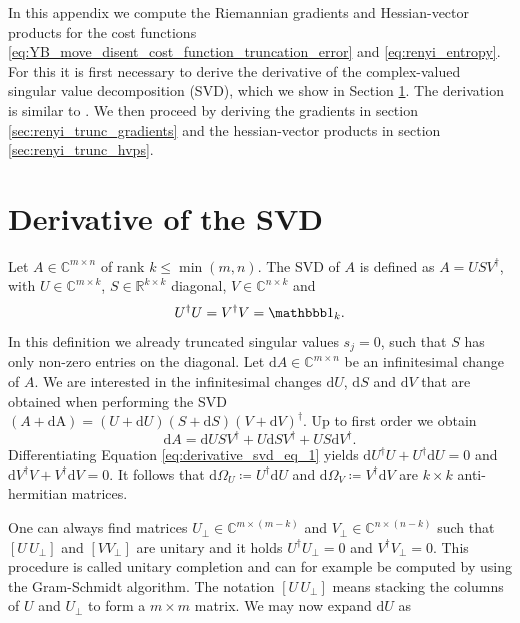 In this appendix we compute the Riemannian gradients and Hessian-vector products for the cost functions \eqref{eq:YB_move_disent_cost_function_truncation_error} and \eqref{eq:renyi_entropy}. For this it is first necessary to derive the derivative of the complex-valued singular value decomposition (SVD), which we show in Section \ref{sec:derivative_of_SVD}. The derivation is similar to \cite{cite:differentiating_the_svd}. We then proceed by deriving the gradients in section \ref{sec:renyi_trunc_gradients} and the hessian-vector products in section \ref{sec:renyi_trunc_hvps}.
\section{Derivative of the SVD}
\label{sec:derivative_of_SVD}
Let $A\in\mathbb{C}^{m\times n}$ of rank $k \le \min(m,n)$. The SVD of $A$ is defined as $A = USV^\dagger$, with $U\in\mathbb{C}^{m\times k}$, $S\in\mathbb{R}^{k\times k}$ diagonal, $V\in\mathbb{C}^{n\times k}$ and
\begin{equation}
	\label{eq:derivative_svd_eq_1}
	 U^\dagger U = V^\dagger V = \id_k.
\end{equation}
In this definition we already truncated singular values $s_j = 0$, such that $S$ has only non-zero entries on the diagonal. Let $\text{d}A\in\mathbb{C}^{m\times n}$ be an infinitesimal change of $A$. We are interested in the infinitesimal changes $\text{d}U$, $\text{d}S$ and $\text{d}V$ that are obtained when performing the SVD $(A+\text{dA}) = (U + \text{d}U)(S + \text{d}S)(V + \text{d}V)^\dagger$. Up to first order we obtain
\begin{equation}
	\label{eq:derivative_svd_eq_2}
	\text{d}A = \text{d}USV^\dagger + U\text{d}SV^\dagger + US\text{d}V^\dagger.
\end{equation}
Differentiating Equation \eqref{eq:derivative_svd_eq_1} yields $\text{d}U^\dagger U + U^\dagger\text{d}U = 0$ and $\text{d}V^\dagger V + V^\dagger\text{d}V = 0$. It follows that $\text{d}\Omega_U \coloneqq U^\dagger\text{d}U$ and $\text{d}\Omega_V \coloneqq V^\dagger\text{d}V$ are $k\times k$ anti-hermitian matrices. \par
One can always find matrices $U_\perp\in\mathbb{C}^{m\times(m-k)}$ and $V_\perp\in\mathbb{C}^{n\times(n-k)}$ such that $\left[U\,U_\perp\right]$ and $\left[V V_\perp\right]$ are unitary and it holds $U^\dagger U_\perp = 0$ and $V^\dagger V_\perp = 0$. This procedure is called unitary completion and can for example be computed by using the Gram-Schmidt algorithm. The notation $\left[U\,U_\perp\right]$ means stacking the columns of $U$ and $U_\perp$ to form a $m\times m$ matrix. We may now expand $\text{d}U$ as
